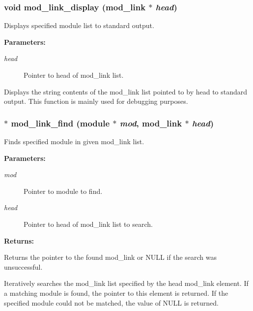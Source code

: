 \subsubsection{\setlength{\rightskip}{0pt plus 5cm}void mod\_\-link\_\-display ({\bf mod\_\-link} $\ast$ {\em head})}\label{link_8h_a10}


Displays specified module list to standard output.

\begin{Desc}
\item[{\bf Parameters: }]\par
\begin{description}
\item[
{\em head}]Pointer to head of mod\_\-link list.

\end{description}
\end{Desc}
Displays the string contents of the mod\_\-link list pointed to by head to standard output. This function is mainly used for debugging purposes. 
\subsubsection{$\ast$ mod\_\-link\_\-find ({\bf module} $\ast$ {\em mod}, {\bf mod\_\-link} $\ast$ {\em head})}\label{link_8h_a15}


Finds specified module in given mod\_\-link list.

\begin{Desc}
\item[{\bf Parameters: }]\par
\begin{description}
\item[
{\em mod}]Pointer to module to find. \item[
{\em head}]Pointer to head of mod\_\-link list to search.

\end{description}
\end{Desc}
\begin{Desc}
\item[{\bf Returns: }]\par
Returns the pointer to the found mod\_\-link or NULL if the search was unsuccessful.

\end{Desc}
Iteratively searches the mod\_\-link list specified by the head mod\_\-link element. If a matching module is found, the pointer to this element is returned. If the specified module could not be matched, the value of NULL is returned. 
